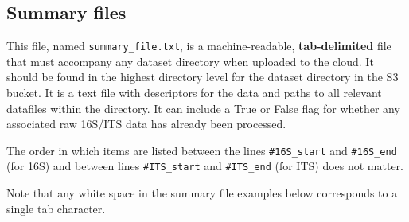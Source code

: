 \documentclass[11pt, oneside]{article}   	%
\begin{document}
\subsection{Summary files}
This file, named {\tt summary\_file.txt}, is a machine-readable, \textbf{tab-delimited} file that must accompany any dataset directory when uploaded to the cloud.  It should be found in the highest directory level for the dataset directory in the S3 bucket.  It is a text file with descriptors for the data and paths to all relevant datafiles within the directory.  It can include a True or False flag for whether any associated raw 16S/ITS data has already been processed.  

The order in which items are listed between the lines {\tt \#16S\_start} and {\tt \#16S\_end} (for 16S) and between lines {\tt \#ITS\_start} and {\tt \#ITS\_end} (for ITS) does not matter.  

Note that any white space in the summary file examples below corresponds to a single tab character.
\end{document}
